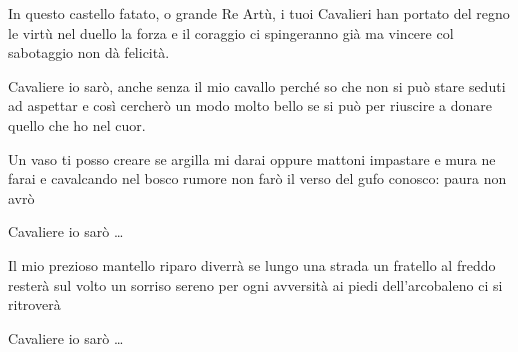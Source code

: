 
\beginverse

In questo castello fatato, o grande Re Artù,
i tuoi Cavalieri han portato del regno le virtù
nel duello la forza e il coraggio ci spingeranno già
ma vincere col sabotaggio non dà felicità.

\endverse

\beginchorus

Cavaliere io sarò, anche senza il mio cavallo perché so
che non si può stare seduti ad aspettar
e così cercherò un modo molto bello se si può
per riuscire a donare quello che ho nel cuor.

\endchorus

\chordsoff

\beginverse

Un vaso ti posso creare se argilla mi darai
oppure mattoni impastare e mura ne farai
e cavalcando nel bosco rumore non farò
il verso del gufo conosco: paura non avrò

\endverse

\beginchorus

Cavaliere io sarò \dots

\endchorus

\beginverse

Il mio prezioso mantello riparo diverrà
se lungo una strada un fratello al freddo resterà
sul volto un sorriso sereno per ogni avversità
ai piedi dell'arcobaleno ci si ritroverà

\endverse

\beginchorus

Cavaliere io sarò \dots

\endchorus

\endsong